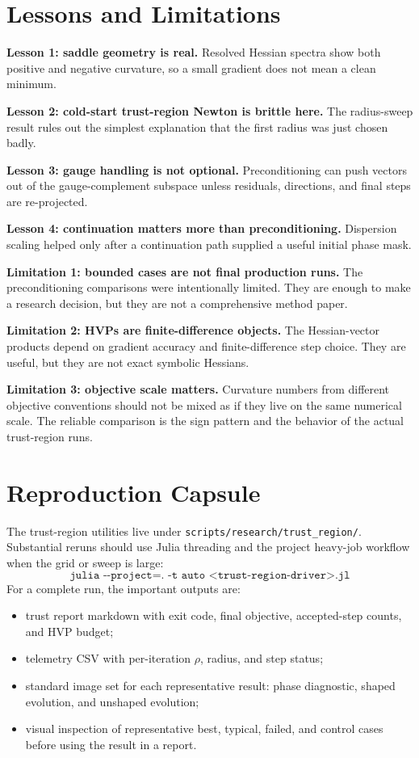 \documentclass[11pt]{article}
\begin{document}
\section{Lessons and Limitations}

\textbf{Lesson 1: saddle geometry is real.} Resolved Hessian spectra show both
positive and negative curvature, so a small gradient does not mean a clean
minimum.

\textbf{Lesson 2: cold-start trust-region Newton is brittle here.} The
radius-sweep result rules out the simplest explanation that the first radius
was just chosen badly.

\textbf{Lesson 3: gauge handling is not optional.} Preconditioning can push
vectors out of the gauge-complement subspace unless residuals, directions, and
final steps are re-projected.

\textbf{Lesson 4: continuation matters more than preconditioning.}
Dispersion scaling helped only after a continuation path supplied a useful
initial phase mask.

\textbf{Limitation 1: bounded cases are not final production runs.} The
preconditioning comparisons were intentionally limited. They are enough to
make a research decision, but they are not a comprehensive method paper.

\textbf{Limitation 2: HVPs are finite-difference objects.} The Hessian-vector
products depend on gradient accuracy and finite-difference step choice. They
are useful, but they are not exact symbolic Hessians.

\textbf{Limitation 3: objective scale matters.} Curvature numbers from
different objective conventions should not be mixed as if they live on the
same numerical scale. The reliable comparison is the sign pattern and the
behavior of the actual trust-region runs.

\section{Reproduction Capsule}

The trust-region utilities live under
\texttt{scripts/research/trust\_region/}. Substantial reruns should use Julia
threading and the project heavy-job workflow when the grid or sweep is large:
\[
    \texttt{julia -{}-project=. -t auto <trust-region-driver>.jl}
\]
For a complete run, the important outputs are:
\begin{itemize}
    \item trust report markdown with exit code, final objective, accepted-step
    counts, and HVP budget;
    \item telemetry CSV with per-iteration \(\rho\), radius, and step status;
    \item standard image set for each representative result:
    phase diagnostic, shaped evolution, and unshaped evolution;
    \item visual inspection of representative best, typical, failed, and
    control cases before using the result in a report.
\end{itemize}
\end{document}
